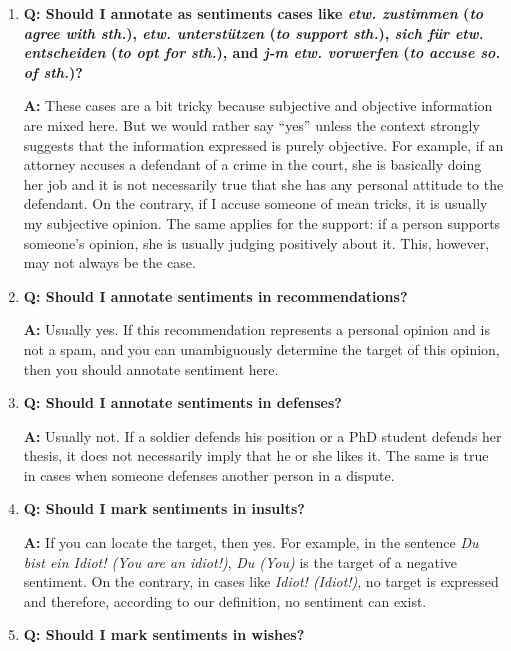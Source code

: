 \documentclass[11pt,a4paper]{article}
\theoremstyle{mytheoremstyle}
\begin{document}
\begin{enumerate}
\item\textbf{Q: Should I annotate as sentiments cases like
  \textit{etw. zustimmen} (\textit{to agree with sth.}), \textit{etw.
    unterst\"utzen} (\textit{to support sth.}), \textit{sich f\"ur
    etw. entscheiden} (\textit{to opt for sth.}), and \textit{j-m
    etw. vorwerfen} (\textit{to accuse so. of sth.})?}

  \textbf{A:} These cases are a bit tricky because subjective and
  objective information are mixed here.  But we would rather say
  ``yes'' unless the context strongly suggests that the information
  expressed is purely objective.  For example, if an attorney accuses
  a defendant of a crime in the court, she is basically doing her job
  and it is not necessarily true that she has any personal attitude to
  the defendant.  On the contrary, if I accuse someone of mean tricks,
  it is usually my subjective opinion.  The same applies for the
  support: if a person supports someone's opinion, she is usually
  judging positively about it.  This, however, may not always be the
  case.

\item\textbf{Q: Should I annotate sentiments in recommendations?}

  \textbf{A:} Usually yes.  If this recommendation represents a
  personal opinion and is not a spam, and you can unambiguously
  determine the target of this opinion, then you should annotate
  sentiment here.

\item\textbf{Q: Should I annotate sentiments in defenses?}

  \textbf{A:} Usually not.  If a soldier defends his position or a PhD
  student defends her thesis, it does not necessarily imply that he or
  she likes it.  The same is true in cases when someone defenses
  another person in a dispute.

\item\textbf{Q: Should I mark sentiments in insults?}

  \textbf{A:} If you can locate the target, then yes.  For example, in
  the sentence \textit{Du bist ein Idiot! (You are an idiot!)},
  \textit{Du (You)} is the target of a negative sentiment.  On the
  contrary, in cases like \textit{Idiot!  (Idiot!)}, no target is
  expressed and therefore, according to our definition, no sentiment
  can exist.

\item\textbf{Q: Should I mark sentiments in wishes?}


\end{enumerate}
\end{document}
